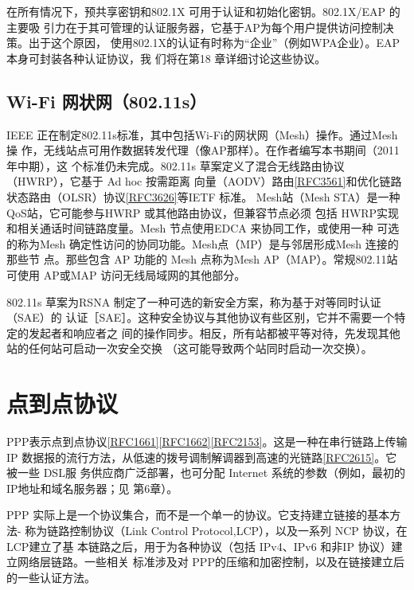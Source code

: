 在所有情况下，预共享密钥和802.1X 可用于认证和初始化密钥。802.1X/EAP 的主要吸
引力在于其可管理的认证服务器，它基于AP为每个用户提供访问控制决策。出于这个原因，
使用802.1X的认证有时称为“企业”（例如WPA企业）。EAP本身可封装各种认证协议，我
们将在第18 章详细讨论这些协议。

\subsection{Wi-Fi 网状网（802.11s）}

IEEE 正在制定802.11s标准，其中包括Wi-Fi的网状网（Mesh）操作。通过Mesh 操
作，无线站点可用作数据转发代理（像AP那样）。在作者编写本书期间（2011年中期），这
个标准仍未完成。802.11s 草案定义了混合无线路由协议（HWRP），它基于 Ad hoc 按需距离
向量（AODV）路由\href{https://www.rfc-editor.org/rfc/rfc3561}{[RFC3561]}和优化链路状态路由（OLSR）协议\href{https://www.rfc-editor.org/rfc/rfc3626}{[RFC3626]}等IETF
标准。
Mesh站（Mesh STA）是一种QoS站，它可能参与HWRP 或其他路由协议，但兼容节点必须
包括 HWRP实现和相关通话时间链路度量。Mesh 节点使用EDCA 来协同工作，或使用一种
可选的称为Mesh 确定性访问的协同功能。Mesh点（MP）是与邻居形成Mesh 连接的那些节
点。那些包含 AP 功能的 Mesh 点称为Mesh AP（MAP）。常规802.11站可使用 AP或MAP
访问无线局域网的其他部分。

802.11s 草案为RSNA 制定了一种可选的新安全方案，称为基于对等同时认证（SAE）的
认证［SAE］。这种安全协议与其他协议有些区别，它并不需要一个特定的发起者和响应者之
间的操作同步。相反，所有站都被平等对待，先发现其他站的任何站可启动一次安全交换
（这可能导致两个站同时启动一次交换）。

\section{点到点协议}

PPP表示点到点协议\href{https://www.rfc-editor.org/rfc/rfc1661}{[RFC1661]}\href{https://www.rfc-editor.org/rfc/rfc1662}{[RFC1662]}\href{https://www.rfc-editor.org/rfc/rfc2153}{[RFC2153]}。这是一种在串行链路上传输IP
数据报的流行方法，从低速的拨号调制解调器到高速的光链路\href{https://www.rfc-editor.org/rfc/rfc2615}{[RFC2615]}。它被一些
DSL服
务供应商广泛部署，也可分配 Internet 系统的参数（例如，最初的IP地址和域名服务器；见
第6章）。

PPP 实际上是一个协议集合，而不是一个单一的协议。它支持建立链接的基本方法-
称为链路控制协议（Link Control Protocol,LCP），以及一系列 NCP 协议，在LCP建立了基
本链路之后，用于为各种协议（包括 IPv4、IPv6 和非IP 协议）建立网络层链路。一些相关
标准涉及对 PPP的压缩和加密控制，以及在链接建立后的一些认证方法。

